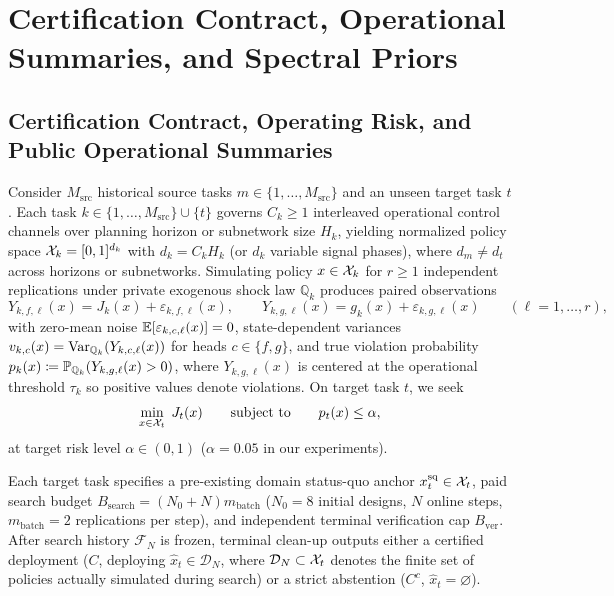 \section{Certification Contract, Operational Summaries, and Spectral Priors}\label{sec:prior}

\subsection{Certification Contract, Operating Risk, and Public Operational Summaries}\label{sec:domain_invariant_psi}

Consider $M_{\mathrm{src}}$ historical source tasks $m \in \{1,\dots,M_{\mathrm{src}}\}$ and an unseen target task $t$. Each task $k \in \{1,\dots,M_{\mathrm{src}}\} \cup \{t\}$ governs $C_k \ge 1$ interleaved operational control channels over planning horizon or subnetwork size $H_k$, yielding normalized policy space $\mathcal{X}_k = [0,1]^{d_k}$ with $d_k = C_k H_k$ (or $d_k$ variable signal phases), where $d_m \neq d_t$ across horizons or subnetworks. Simulating policy $x \in \mathcal{X}_k$ for $r \ge 1$ independent replications under private exogenous shock law $\mathbb{Q}_k$ produces paired observations
\begin{equation}\label{eq:obs_model}
  Y_{k,f,\ell}(x) = J_k(x) + \varepsilon_{k,f,\ell}(x),
  \qquad
  Y_{k,g,\ell}(x) = g_k(x) + \varepsilon_{k,g,\ell}(x)
  \qquad (\ell = 1,\dots,r),
\end{equation}
with zero-mean noise $\mathbb{E}[\varepsilon_{k,c,\ell}(x)] = 0$, state-dependent variances $v_{k,c}(x) = \operatorname{Var}_{\mathbb{Q}_k}(Y_{k,c,\ell}(x))$ for heads $c \in \{f, g\}$, and true violation probability $p_k(x) \coloneqq \mathbb{P}_{\mathbb{Q}_k}(Y_{k,g,\ell}(x) > 0)$, where $Y_{k,g,\ell}(x)$ is centered at the operational threshold $\tau_k$ so positive values denote violations. On target task $t$, we seek
\begin{equation}\label{eq:main_ccp}
  \min_{x \in \mathcal{X}_t} \; J_t(x)
  \qquad \text{subject to} \qquad p_t(x) \le \alpha,
\end{equation}
at target risk level $\alpha \in (0, 1)$ ($\alpha = 0.05$ in our experiments).

Each target task specifies a pre-existing domain status-quo anchor $x_t^{\mathrm{sq}} \in \mathcal{X}_t$, paid search budget $B_{\mathrm{search}} = (N_0 + N) m_{\mathrm{batch}}$ ($N_0 = 8$ initial designs, $N$ online steps, $m_{\mathrm{batch}} = 2$ replications per step), and independent terminal verification cap $B_{\mathrm{ver}}$. After search history $\mathcal{F}_N$ is frozen, terminal clean-up \citep{boesel2003using} outputs either a certified deployment ($C$, deploying $\hat{x}_t \in \mathcal{D}_N$, where $\mathcal{D}_N \subset \mathcal{X}_t$ denotes the finite set of policies actually simulated during search) or a strict abstention ($C^c$, $\hat{x}_t = \varnothing$).

